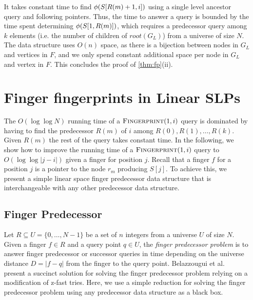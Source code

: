 \documentclass[11pt]{article}
\newcommand{\fingerprintq}{\ensuremath{\textsc{Fingerprint}}}
\newcommand{\fp}{\ensuremath\phi}
\newcommand{\rootnode}{\ensuremath{\mathit{root}}}
\newcommand{\lslp}{\ensuremath{G_L} }
\begin{document}
It takes constant time to find $\fp(S[R(m)+1, i])$ using a single level ancestor query and following pointers. Thus, the time to answer a query is bounded by the time spent determining $\fp(S[1, R(m)])$, which requires a predecessor query among $k$ elements (i.e. the number of children of $\rootnode(\lslp)$) from a universe of size $N$. The data structure uses $O(n)$ space, as there is a bijection between nodes in $\lslp$ and vertices in $F$, and we only spend constant additional space per node in $\lslp$ and vertex in $F$. This concludes the proof of \autoref{thm:fp}(ii).


\section{Finger fingerprints in Linear SLPs}
The $O(\log\log N)$ running time of a $\fingerprintq(1, i)$ query is dominated by having to find the predecessor $R(m)$ of $i$ among $R(0), R(1), \ldots, R(k)$. Given $R(m)$ the rest of the query takes constant time. In the following, we show how to improve the running time of a $\fingerprintq(1, i)$ query to $O(\log \log |j-i|)$ given a finger for position $j$.  Recall that a finger $f$ for  a position $j$ is a pointer to the node $r_m$ producing $S[j]$.
To achieve this, we present a simple linear space finger predecessor data structure that is interchangeable with any other predecessor data structure.

\subsection{Finger Predecessor}
Let $R \subseteq U = \{ 0, \ldots, N-1 \}$ be a set of $n$ integers from a universe $U$ of size $N$. Given a finger $f \in R$ and a query point $q \in U$, the \emph{finger predecessor problem} is to answer finger predecessor or successor queries in time depending on the universe distance $D = |f-q|$ from the finger to the query point. Belazzougui et al.~\cite{fingerpred} present a succinct solution for solving the finger predecessor problem relying on a modification of z-fast tries. Here, we use a simple reduction for solving the finger predecessor problem using any predecessor data structure as a black box. 
\end{document}
